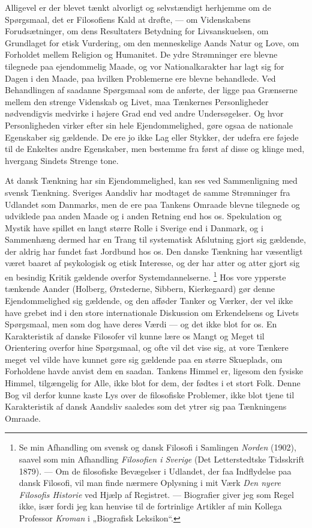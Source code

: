 \documentclass[12pt,a4paper,openany]{book}
\newcommand{\opage}[1]{\marginnote{\footnotesize\textit{[#1]}}}
\begin{document}
Alligevel er der blevet tænkt alvorligt og selvstændigt herhjemme om de
Spørgsmaal, det er Filosofiens Kald at drøfte, --- om Videnskabens
Forudsætninger, om dens Resultaters Betydning for Livsanskuelsen, om
Grundlaget for etisk Vurdering, om den menneskelige Aands Natur og Love, om
Forholdet mellem Religion og Humanitet. De ydre Strømninger ere blevne
tilegnede paa ejendommelig Maade, og vor Nationalkarakter har lagt sig for
Dagen i den Maade, paa hvilken Problemerne ere blevne behandlede. Ved
Behandlingen af saadanne Spørgsmaal som de anførte, der ligge paa Grænserne
mellem den strenge Videnskab og Livet, maa Tænkernes Personligheder
nødvendigvis medvirke i højere Grad end ved andre Undersøgelser. Og hvor
Personligheden virker efter sin hele Ejendommelighed, gøre ogsaa de nationale
Egenskaber sig gældende. De ere jo ikke Lag eller Stykker, der udefra ere
føjede til de Enkeltes andre Egenskaber, men bestemme fra først af disse og
klinge med, hvergang Sindets Strenge tone.

At dansk Tænkning har sin Ejendommelighed, kan ses ved Sammenligning med
svensk Tænkning. Sveriges Aandsliv
\setcounter{footnote}{0}%
\opage{2}har modtaget de samme Strømninger fra Udlandet som Danmarks, men de ere paa
Tankens Omraade blevne tilegnede og udviklede paa anden Maade og i anden
Retning end hos os. Spekulation og Mystik have spillet en langt større Rolle i
Sverige end i Danmark, og i Sammenhæng dermed har en Trang til systematisk
Afslutning gjort sig gældende, der aldrig har fundet fast Jordbund hos os. Den
danske Tænkning har væsentligt været baaret af psykologisk og etisk Interesse,
og der har atter og atter gjort sig en besindig Kritik gældende overfor
Systemdannelserne.%
\footnote[1]{Se min Afhandling om svensk og dansk Filosofi i Samlingen
\textit{Norden} (1902), saavel som min Afhandling \textit{Filosofien i Sverige}
(Det Letterstedtske Tidsskrift 1879). --- Om de filosofiske Bevægelser i
Udlandet, der faa Indflydelse paa dansk Filosofi, vil man finde nærmere
Oplysning i mit Værk \textit{Den nyere Filosofis Historie} ved Hjælp af
Registret. --- Biografier giver jeg som Regel ikke, især fordi jeg kan henvise
til de fortrinlige Artikler af min Kollega Professor \emph{Kroman} i
„Biografisk Leksikon“.} Hos vore ypperste tænkende Aander (Holberg,
Ørstederne, Sibbern, Kierkegaard) gør denne Ejendommelighed sig gældende, og
den afføder Tanker og Værker, der vel ikke have grebet ind i den store
internationale Diskussion om Erkendelsens og Livets Spørgsmaal, men som dog
have deres Værdi --- og det ikke blot for os. En Karakteristik af danske
Filosofer vil kunne lære os Mangt og Meget til Orientering overfor hine
Spørgsmaal, og ofte vil det vise sig, at vore Tænkere meget vel vilde have
kunnet gøre sig gældende paa en større Skueplads, om Forholdene havde anvist
dem en saadan. Tankens Himmel er, ligesom den fysiske Himmel, tilgængelig for
Alle, ikke blot for dem, der fødtes i et stort Folk. Denne Bog vil derfor kunne
kaste Lys over de filosofiske Problemer, ikke blot tjene til Karakteristik af
dansk Aandsliv saaledes som det ytrer sig paa Tænkningens Omraade.
\end{document}
